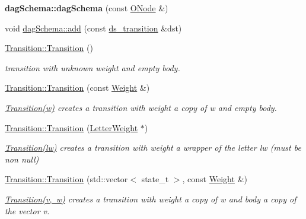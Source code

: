 \begin{DoxyCompactItemize}
\mbox{\label{group__schemata_ga7f1258e692e42b123b039e9aa1c256b8}} 
{\bfseries dag\+Schema\+::dag\+Schema} (const \mbox{\hyperlink{classONode}{O\+Node}} \&)
\item 
void \mbox{\hyperlink{group__schemata_ga0dc3e9cf7edbc289976639574ca23d20}{dag\+Schema\+::add}} (const \mbox{\hyperlink{structds__transition}{ds\+\_\+transition}} \&dst)
\item 
\mbox{\label{group__schemata_ga73b44b2338b11807f77b620a3e810f92}} 
\mbox{\hyperlink{group__schemata_ga73b44b2338b11807f77b620a3e810f92}{Transition\+::\+Transition}} ()
\begin{DoxyCompactList}\small\item\em transition with unknown weight and empty body. \end{DoxyCompactList}\item 
\mbox{\hyperlink{group__schemata_ga6e08e637325ab62ee6bfbdb99c8f8a71}{Transition\+::\+Transition}} (const \mbox{\hyperlink{classWeight}{Weight}} \&)
\begin{DoxyCompactList}\small\item\em \mbox{\hyperlink{classTransition}{Transition(w)}} creates a transition with weight a copy of w and empty body. \end{DoxyCompactList}\item 
\mbox{\label{group__schemata_ga09dca130387fcf6ead3f80cc523a59de}} 
\mbox{\hyperlink{group__schemata_ga09dca130387fcf6ead3f80cc523a59de}{Transition\+::\+Transition}} (\mbox{\hyperlink{classLetterWeight}{Letter\+Weight}} $\ast$)
\begin{DoxyCompactList}\small\item\em \mbox{\hyperlink{classTransition}{Transition(lw)}} creates a transition with weight a wrapper of the letter lw (must be non null) \end{DoxyCompactList}\item 
\mbox{\hyperlink{group__schemata_gad126f7c68acac0315b1782decaf54d3b}{Transition\+::\+Transition}} (std\+::vector$<$ state\+\_\+t $>$, const \mbox{\hyperlink{classWeight}{Weight}} \&)
\begin{DoxyCompactList}\small\item\em \mbox{\hyperlink{classTransition}{Transition(v, w)}} creates a transition with weight a copy of w and body a copy of the vector v. \end{DoxyCompactList}\item 

\end{DoxyCompactItemize}
